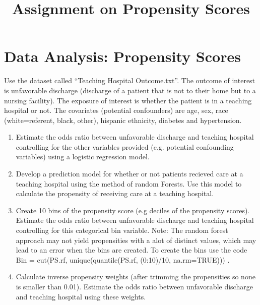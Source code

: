 \documentclass[11pt]{article}
\begin{document}
\title{Assignment on Propensity Scores}

\maketitle

\pagestyle{headings}

\section{Data Analysis: Propensity Scores}

Use the dataset called ``Teaching Hospital Outcome.txt''. The outcome of interest is unfavorable discharge (discharge of a patient that is not to their home but to a nursing facility). The exposure of interest is whether the patient is in a teaching hospital or not. The covariates (potential confounders) are age, sex, race (white=referent, black, other), hispanic ethnicity, diabetes and hypertension.
  
\begin{enumerate}

\item Estimate the odds ratio between unfavorable discharge and teaching hospital controlling for the other variables provided (e.g. potential confounding variables) using a logistic regression model. 

\item Develop a prediction model for whether or not patients recieved care at a teaching hospital using the method of random Forests. Use this model to calculate the propensity of receiving care at a teaching hospital. 

\item Create 10 bins of the propensity score (e.g deciles of the propensity scores). Estimate the odds ratio between unfavorable discharge and teaching hospital controlling for this categorical bin variable. Note: The random forest approach may not yield propensities with a alot of distinct values, which may lead to an error when the bins are created. To create the bins use the code
Bin = cut(PS.rf, unique(quantile(PS.rf, (0:10)/10, na.rm=TRUE))) .

\item Calculate inverse propensity weights (after trimming the propensities so none is smaller than 0.01). Estimate the odds ratio between unfavorable discharge and teaching hospital using these weights.

\end{enumerate} 
\end{document}
